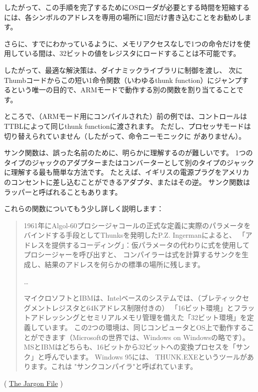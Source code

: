 したがって、この手順を完了するために\ac{OS}ローダが必要とする時間を短縮するには、各シンボルのアドレスを専用の場所に1回だけ書き込むことをお勧めします。

さらに、すでにわかっているように、メモリアクセスなしで1つの命令だけを使用している間は、32ビットの値をレジスタにロードすることは不可能です。

したがって、最適な解決策は、ダイナミックライブラリに制御を渡し、
次にThumbコードからこの短い1命令関数（いわゆる\gls{thunk function}）にジャンプするという唯一の目的で、ARMモードで動作する別の関数を割り当てることです。

ところで、（ARMモード用にコンパイルされた）前の例では、コントロールは\\TT{BL}によって同じ\gls{thunk function}に渡されます。
ただし、プロセッサモードは切り替えられていません（したがって、命令ニーモニックに がありません）。


サンク関数は、誤った名前のために、明らかに理解するのが難しいです。 
1つのタイプのジャックのアダプターまたはコンバーターとして別のタイプのジャックに理解する最も簡単な方法です。 
たとえば、イギリスの電源プラグをアメリカのコンセントに差し込むことができるアダプタ、またはその逆。 
サンク関数はラッパーと呼ばれることもあります。

これらの関数についてもう少し詳しく説明します：

\begin{framed}
\begin{quotation}
1961年にAlgol-60プロシージャコールの正式な定義に実際のパラメータをバインドする手段としてThunksを発明したP.Z. Ingermanによると、
「アドレスを提供するコーディング」：仮パラメータの代わりに式を使用してプロシージャーを呼び出すと、
コンパイラーは式を計算するサンクを生成し、結果のアドレスを何らかの標準の場所に残します。

\dots

マイクロソフトとIBMは、Intelベースのシステムでは、（ブレティックセグメントレジスタと64Kアドレス制限付きの）
「16ビット環境」とフラットアドレッシングとセミリアルメモリ管理を備えた「32ビット環境」を定義しています。
この2つの環境は、同じコンピュータとOS上で動作することができます（Microsoftの世界では、Windows on Windowsの略です）。 
MSとIBMはどちらも、16ビットから32ビットへの変換プロセスを「サンク」と呼んでいます。 
Windows 95には、 THUNK.EXEというツールがあります。これは "サンクコンパイラ"と呼ばれています。
\end{quotation}
\end{framed}
( \href{http://www.catb.org/jargon/html/T/thunk.html}{The Jargon File} )

